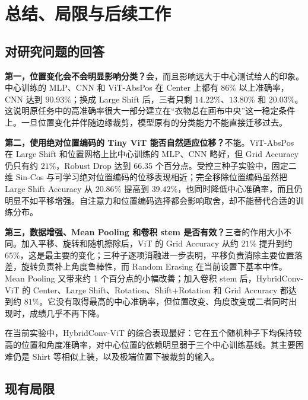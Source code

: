 \section{总结、局限与后续工作}

\subsection{对研究问题的回答}

\textbf{第一，位置变化会不会明显影响分类？}会，而且影响远大于中心测试给人的印象。中心训练的 MLP、CNN 和 ViT-AbsPos 在 Center 上都有 $86\%$ 以上准确率，CNN 达到 $90.93\%$；换成 Large Shift 后，三者只剩 $14.22\%$、$13.80\%$ 和 $20.03\%$。这说明原任务中的高准确率很大一部分建立在“衣物总在画布中央”这一稳定条件上。一旦位置变化并伴随边缘裁剪，模型原有的分类能力不能直接迁移过去。

\textbf{第二，使用绝对位置编码的 Tiny ViT 能否自然适应位移？}不能。ViT-AbsPos 在 Large Shift 和位置网格上比中心训练的 MLP、CNN 略好，但 Grid Accuracy 仍只有约 $21\%$，Robust Drop 达到 66.35 个百分点。受控三种子实验中，固定二维 Sin-Cos 与可学习绝对位置编码的位移表现相近；完全移除位置编码虽然把 Large Shift Accuracy 从 $20.86\%$ 提高到 $39.42\%$，也同时降低中心准确率，而且仍明显不如平移增强。自注意力和位置编码选择都会影响取舍，却不能替代合适的训练分布。

\textbf{第三，数据增强、Mean Pooling 和卷积 stem 是否有效？}三者的作用大小不同。加入平移、旋转和随机擦除后，ViT 的 Grid Accuracy 从约 $21\%$ 提升到约 $65\%$，这是最主要的变化；三种子逐项消融进一步表明，平移负责消除主要位置落差，旋转负责补上角度鲁棒性，而 Random Erasing 在当前设置下基本中性。Mean Pooling 又带来约 1 个百分点的小幅改善；加入卷积 stem 后，HybridConv-ViT 的 Center、Large Shift、Rotation、Shift+Rotation 和 Grid Accuracy 都达到约 $81\%$。它没有取得最高的中心准确率，但位置改变、角度改变或二者同时出现时，成绩几乎不再下降。

在当前实验中，HybridConv-ViT 的综合表现最好：它在五个随机种子下均保持较高的位置和角度准确率，对中心位置的依赖明显弱于三个中心训练基线。其主要困难仍是 Shirt 等相似上装，以及极端位置下被裁剪的输入。

\subsection{现有局限}

